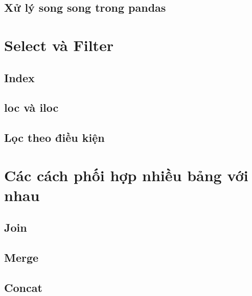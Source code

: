 \documentclass[
]{book}
\begin{document}
\hypertarget{xux1eed-luxfd-song-song-trong-pandas}{%
\section{Xử lý song song trong pandas}\label{xux1eed-luxfd-song-song-trong-pandas}}

\hypertarget{select-vuxe0-filter}{%
\chapter{Select và Filter}\label{select-vuxe0-filter}}

\hypertarget{index}{%
\section{Index}\label{index}}

\hypertarget{loc-vuxe0-iloc}{%
\section{loc và iloc}\label{loc-vuxe0-iloc}}

\hypertarget{lux1ecdc-theo-ux111iux1ec1u-kiux1ec7n}{%
\section{Lọc theo điều kiện}\label{lux1ecdc-theo-ux111iux1ec1u-kiux1ec7n}}

\hypertarget{cuxe1c-cuxe1ch-phux1ed1i-hux1ee3p-nhiux1ec1u-bux1ea3ng-vux1edbi-nhau}{%
\chapter{Các cách phối hợp nhiều bảng với nhau}\label{cuxe1c-cuxe1ch-phux1ed1i-hux1ee3p-nhiux1ec1u-bux1ea3ng-vux1edbi-nhau}}

\hypertarget{join}{%
\section{Join}\label{join}}

\hypertarget{merge}{%
\section{Merge}\label{merge}}

\hypertarget{concat}{%
\section{Concat}\label{concat}}
\end{document}
